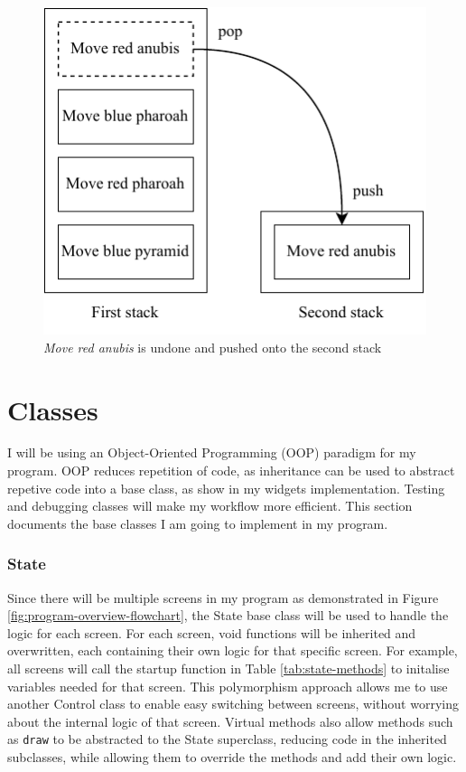 \documentclass[../main/main.tex]{subfiles}
\begin{document}
\begin{figure}[H]
    \centering
    \includegraphics[width=0.6\columnwidth]{../design/assets/stack.pdf}
    \caption{\textit{Move red anubis} is undone and pushed onto the second stack}
    \label{fig:stack-diagram}
\end{figure}

\section{Classes}
I will be using an Object-Oriented Programming (OOP) paradigm for my program. OOP reduces repetition of code, as inheritance can be used to abstract repetive code into a base class, as show in my widgets implementation. Testing and debugging classes will make my workflow more efficient. This section documents the base classes I am going to implement in my program.

\subsubsection*{State}
Since there will be multiple screens in my program as demonstrated in Figure \ref{fig:program-overview-flowchart}, the State base class will be used to handle the logic for each screen. For each screen, void functions will be inherited and overwritten, each containing their own logic for that specific screen. For example, all screens will call the startup function in Table \ref{tab:state-methods} to initalise variables needed for that screen. This polymorphism approach allows me to use another Control class to enable easy switching between screens, without worrying about the internal logic of that screen. Virtual methods also allow methods such as \lstinline[language=Python]{draw} to be abstracted to the State superclass, reducing code in the inherited subclasses, while allowing them to override the methods and add their own logic.
\end{document}
